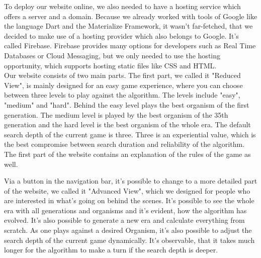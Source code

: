 To deploy our website online, we also needed to have a hosting service which offers a server and a domain. Because we already worked with tools of Google like the language Dart and the Materialize Framework, it wasn't far-fetched, that we decided to make use of a hosting provider which also belongs to Google. It's called Firebase. Firebase provides many options for developers such as Real Time Databases or Cloud Messaging, but we only needed to use the hosting opportunity, which supports hosting static files like CSS and HTML.\\

Our website consists of two main parts. The first part, we called it "Reduced View", is mainly designed for an easy game experience, where you can choose between three levels to play against the algorithm. The levels include "easy", "medium" and "hard". Behind the easy level plays the best organism of the first generation. 
The medium level is played by the best organism of the 35th %
generation and the hard level is the best organism of the whole era. The default search depth of the current game is three. Three is an experiential value, which is the best compromise between search duration and reliability of the algorithm.
The first part of the website contains an explanation of the rules of the game as well.

Via a button in the navigation bar, it's possible to change to a more detailed  part of the website, we called it "Advanced View", which we designed for people who are interested in what's going on behind the scenes. It's possible to see the whole era with all generations and organisms and it's evident, how the algorithm has evolved. It's also possible to generate a new era and calculate everything from scratch. As one plays against a desired Organism, it's also possible to adjust the search depth of the current game dynamically. It's observable, that it takes much longer for the algorithm to make a turn if the search depth is deeper. %



